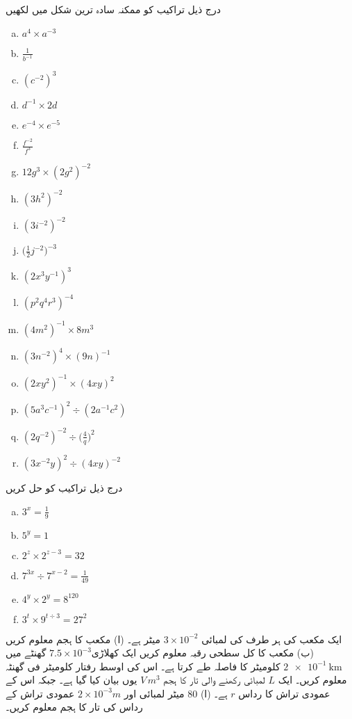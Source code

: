 درج ذیل تراکیب کو ممکنہ سادہ ترین شکل میں لکھیں
\begin{multicols}{3}
\begin{enumerate}[a.]
\item
\(a^{4}\times a^{-3}\)
\item
\(\frac{1}{b^{-1}}\)
\item
\((c^{-2})^{3}\)
\item
\(d^{-1}\times 2d\)
\item
\(e^{-4}\times e^{-5}\)
\item
\(\frac{f^{-2}}{f^{3}}\)
\item
\(12g^{3}\times(2g^{2})^{-2}\)
\item
\((3h^{2})^{-2}\)
\item
\((3i^{-2})^{-2}\)
\item
\(\big(\frac{1}{2}j^{-2}\big)^{-3}\)
\item
\((2x^{3}y^{-1})^{3}\)
\item
\((p^{2}q^{4}r^{3})^{-4}\)
\item
\((4m^{2})^{-1}\times 8m^{3}\)
\item
\((3n^{-2})^{4}\times (9n)^{-1}\)
\item
\((2xy^{2})^{-1}\times (4xy)^{2}\)
\item
\((5a^{3}c^{-1})^{2}\div (2a^{-1}c^{2})\)
\item
\((2q^{-2})^{-2}\div \big(\frac{4}{q}\big)^{2}\)
\item
\((3x^{-2}y)^{2}\div(4xy)^{-2}\)
\end{enumerate}
\end{multicols}
درج ذیل تراکیب کو حل کریں
\begin{multicols}{3}
\begin{enumerate}[a.]
\item
\(3^{x}=\frac{1}{9}\)
\item
\(5^{y}=1\)
\item
\(2^{z}\times 2^{z-3}=32\)
\item
\(7^{3x}\div 7^{x-2}=\frac{1}{49}\)
\item
\(4^{y}\times 2^{y}=8^{120}\)
\item
\(3^{t}\times 9^{t\div 3}=27^{2}\)
\end{enumerate}
\end{multicols}
ایک مکعب کی ہر طرف کی لمبائی \(3\times 10^{-2}\) میٹر ہے۔
(ا) مکعب کا ہجم معلوم کریں
(ب) مکعب کا کل سطحی رقبہ معلوم کریں
ایک کھلاڑی\(7.5\times 10 ^{-3}\) گھنٹے میں  \(\SI{2e-1}{\kilo\meter}\) کلومیٹر کا فاصلہ طے کرتا ہے۔ اس کی اوسط رفتار کلومیٹر فی گھنٹہ معلوم کریں۔
ایک 
\(L\)
لمبائی رکھنے والی تار کا ہجم
 \(V\,m^{3}\)
 یوں بیان کیا گیا ہے۔ جبکہ اس کے عمودی تراش کا رداس
 \(r\)
  ہے۔
(ا) 
\(80\)
میٹر لمبائی اور \(2\times 10^{-3}m\) عمودی تراش کے رداس کی تار کا ہجم معلوم کریں۔

